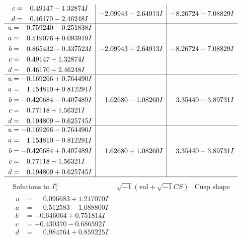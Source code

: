 \documentclass[1p]{elsarticle_modified}
\theoremstyle{definition}
\newcommand{\I}{\sqrt{-1}}
\begin{document}
$$\begin{array}{c|c|c}
\begin{aligned}
c &= \phantom{-}0.49147 - 1.32874 I \\
d &= \phantom{-}0.46170 - 2.46248 I\end{aligned}
 & -2.09943 - 2.64913 I & -8.26724 + 7.08829 I \\ \hline\begin{aligned}
u &= -0.759240 - 0.251838 I \\
a &= \phantom{-}0.519076 + 0.093919 I \\
b &= \phantom{-}0.865432 - 0.337523 I \\
c &= \phantom{-}0.49147 + 1.32874 I \\
d &= \phantom{-}0.46170 + 2.46248 I\end{aligned}
 & -2.09943 + 2.64913 I & -8.26724 - 7.08829 I \\ \hline\begin{aligned}
u &= -0.169266 + 0.764490 I \\
a &= \phantom{-}1.154810 + 0.812291 I \\
b &= -0.420684 - 0.407489 I \\
c &= \phantom{-}0.77118 + 1.56321 I \\
d &= \phantom{-}0.194809 - 0.625745 I\end{aligned}
 & \phantom{-}1.62680 - 1.08260 I & \phantom{-}3.35440 + 3.89731 I \\ \hline\begin{aligned}
u &= -0.169266 - 0.764490 I \\
a &= \phantom{-}1.154810 - 0.812291 I \\
b &= -0.420684 + 0.407489 I \\
c &= \phantom{-}0.77118 - 1.56321 I \\
d &= \phantom{-}0.194809 + 0.625745 I\end{aligned}
 & \phantom{-}1.62680 + 1.08260 I & \phantom{-}3.35440 - 3.89731 I\\
 \hline 
 \end{array}$$\newpage$$\begin{array}{c|c|c}  
\text{Solutions to }I^u_{1}& \I (\text{vol} + \sqrt{-1}CS) & \text{Cusp shape}\\
 \hline 
\begin{aligned}
u &= \phantom{-}0.096683 + 1.217070 I \\
a &= \phantom{-}0.512583 - 1.088800 I \\
b &= -0.646064 + 0.751814 I \\
c &= -0.430370 - 0.686592 I \\
d &= \phantom{-}0.984764 + 0.859225 I\end{aligned}

\end{array}$$
\end{document}
